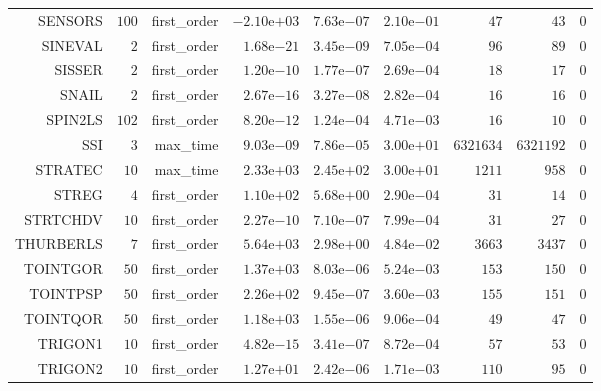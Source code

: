 \begin{longtable}{rrrrrrrrr}
SENSORS & \(   100\) & first\_order & \(-2.10\)e\(+03\) & \( 7.63\)e\(-07\) & \( 2.10\)e\(-01\) & \(    47\) & \(    43\) & \(     0\) \\
SINEVAL & \(     2\) & first\_order & \( 1.68\)e\(-21\) & \( 3.45\)e\(-09\) & \( 7.05\)e\(-04\) & \(    96\) & \(    89\) & \(     0\) \\
SISSER & \(     2\) & first\_order & \( 1.20\)e\(-10\) & \( 1.77\)e\(-07\) & \( 2.69\)e\(-04\) & \(    18\) & \(    17\) & \(     0\) \\
SNAIL & \(     2\) & first\_order & \( 2.67\)e\(-16\) & \( 3.27\)e\(-08\) & \( 2.82\)e\(-04\) & \(    16\) & \(    16\) & \(     0\) \\
SPIN2LS & \(   102\) & first\_order & \( 8.20\)e\(-12\) & \( 1.24\)e\(-04\) & \( 4.71\)e\(-03\) & \(    16\) & \(    10\) & \(     0\) \\
SSI & \(     3\) & max\_time & \( 9.03\)e\(-09\) & \( 7.86\)e\(-05\) & \( 3.00\)e\(+01\) & \(6321634\) & \(6321192\) & \(     0\) \\
STRATEC & \(    10\) & max\_time & \( 2.33\)e\(+03\) & \( 2.45\)e\(+02\) & \( 3.00\)e\(+01\) & \(  1211\) & \(   958\) & \(     0\) \\
STREG & \(     4\) & first\_order & \( 1.10\)e\(+02\) & \( 5.68\)e\(+00\) & \( 2.90\)e\(-04\) & \(    31\) & \(    14\) & \(     0\) \\
STRTCHDV & \(    10\) & first\_order & \( 2.27\)e\(-10\) & \( 7.10\)e\(-07\) & \( 7.99\)e\(-04\) & \(    31\) & \(    27\) & \(     0\) \\
THURBERLS & \(     7\) & first\_order & \( 5.64\)e\(+03\) & \( 2.98\)e\(+00\) & \( 4.84\)e\(-02\) & \(  3663\) & \(  3437\) & \(     0\) \\
TOINTGOR & \(    50\) & first\_order & \( 1.37\)e\(+03\) & \( 8.03\)e\(-06\) & \( 5.24\)e\(-03\) & \(   153\) & \(   150\) & \(     0\) \\
TOINTPSP & \(    50\) & first\_order & \( 2.26\)e\(+02\) & \( 9.45\)e\(-07\) & \( 3.60\)e\(-03\) & \(   155\) & \(   151\) & \(     0\) \\
TOINTQOR & \(    50\) & first\_order & \( 1.18\)e\(+03\) & \( 1.55\)e\(-06\) & \( 9.06\)e\(-04\) & \(    49\) & \(    47\) & \(     0\) \\
TRIGON1 & \(    10\) & first\_order & \( 4.82\)e\(-15\) & \( 3.41\)e\(-07\) & \( 8.72\)e\(-04\) & \(    57\) & \(    53\) & \(     0\) \\
TRIGON2 & \(    10\) & first\_order & \( 1.27\)e\(+01\) & \( 2.42\)e\(-06\) & \( 1.71\)e\(-03\) & \(   110\) & \(    95\) & \(     0\) \\

\end{longtable}
